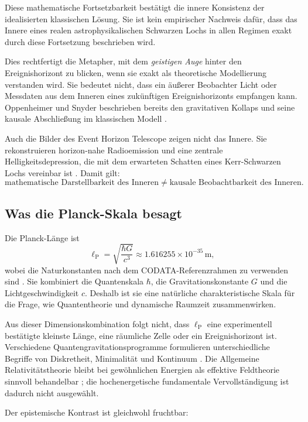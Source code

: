 \documentclass[11pt,a4paper]{article}
\theoremstyle{remark}
\begin{document}
Diese mathematische Fortsetzbarkeit bestätigt die innere Konsistenz der
idealisierten klassischen Lösung. Sie ist kein empirischer Nachweis dafür,
dass das Innere eines realen astrophysikalischen Schwarzen Lochs in allen
Regimen exakt durch diese Fortsetzung beschrieben wird.

Dies rechtfertigt die Metapher, mit dem \emph{geistigen Auge} hinter den
Ereignishorizont zu blicken, wenn sie exakt als theoretische Modellierung
verstanden wird. Sie bedeutet nicht, dass ein äußerer Beobachter Licht oder
Messdaten aus dem Inneren eines zukünftigen Ereignishorizonts empfangen kann.
Oppenheimer und Snyder beschrieben bereits den gravitativen Kollaps und seine
kausale Abschließung im klassischen Modell \citep{oppenheimer1939}.

Auch die Bilder des Event Horizon Telescope zeigen nicht das Innere. Sie
rekonstruieren horizon-nahe Radioemission und eine zentrale
Helligkeitsdepression, die mit dem erwarteten Schatten eines Kerr-Schwarzen
Lochs vereinbar ist \citep{eht2019i,eht2019vi}. Damit gilt:
\[
  \boxed{
  \text{mathematische Darstellbarkeit des Inneren}
  \neq
  \text{kausale Beobachtbarkeit des Inneren}.}
\]

\subsection{Was die Planck-Skala besagt}

Die Planck-Länge ist
\[
  \ell_{\mathrm P}=\sqrt{\frac{\hbar G}{c^3}}
  \approx 1.616255\times10^{-35}\,\mathrm m,
\]
wobei die Naturkonstanten nach dem CODATA-Referenzrahmen zu verwenden sind
\citep{codata2022}. Sie kombiniert die Quantenskala \(\hbar\), die
Gravitationskonstante \(G\) und die Lichtgeschwindigkeit \(c\). Deshalb ist
sie eine natürliche charakteristische Skala für die Frage, wie
Quantentheorie und dynamische Raumzeit zusammenwirken.

Aus dieser Dimensionskombination folgt nicht, dass \(\ell_{\mathrm P}\) eine
experimentell bestätigte kleinste Länge, eine räumliche Zelle oder ein
Ereignishorizont ist. Verschiedene Quantengravitationsprogramme formulieren
unterschiedliche Begriffe von Diskretheit, Minimalität und Kontinuum
\citep{hossenfelder2013}. Die Allgemeine Relativitätstheorie bleibt bei
gewöhnlichen Energien als effektive Feldtheorie sinnvoll behandelbar
\citep{donoghue1994}; die hochenergetische fundamentale Vervollständigung ist
dadurch nicht ausgewählt.

Der epistemische Kontrast ist gleichwohl fruchtbar:
\end{document}

